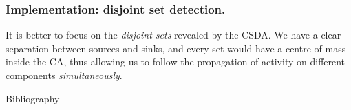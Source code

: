 \documentclass[xetex,mathserif,serif]{beamer}
\begin{document}
  
  \begin{frame}
     \frametitle{Implementation: disjoint set detection.}
     It is better to focus on the \emph{disjoint sets} revealed by
     the CSDA. We have a clear separation between sources and sinks,
     and every set would have a centre of mass inside the CA, thus
     allowing us to follow the propagation of activity on different
     components \emph{simultaneously}.
     
  \end{frame}

  
  \begin{frame}{Bibliography}
    
  \end{frame}


  
  
\end{document}
